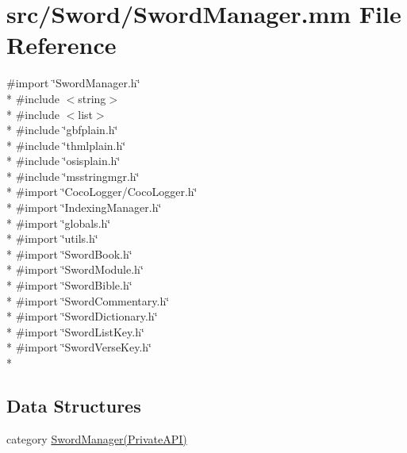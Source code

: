 \hypertarget{_sword_manager_8mm}{\section{src/\-Sword/\-Sword\-Manager.mm File Reference}
\label{_sword_manager_8mm}
}
{\ttfamily \#import \char`\"{}Sword\-Manager.\-h\char`\"{}}\\*
{\ttfamily \#include $<$string$>$}\\*
{\ttfamily \#include $<$list$>$}\\*
{\ttfamily \#include \char`\"{}gbfplain.\-h\char`\"{}}\\*
{\ttfamily \#include \char`\"{}thmlplain.\-h\char`\"{}}\\*
{\ttfamily \#include \char`\"{}osisplain.\-h\char`\"{}}\\*
{\ttfamily \#include \char`\"{}msstringmgr.\-h\char`\"{}}\\*
{\ttfamily \#import \char`\"{}Coco\-Logger/\-Coco\-Logger.\-h\char`\"{}}\\*
{\ttfamily \#import \char`\"{}Indexing\-Manager.\-h\char`\"{}}\\*
{\ttfamily \#import \char`\"{}globals.\-h\char`\"{}}\\*
{\ttfamily \#import \char`\"{}utils.\-h\char`\"{}}\\*
{\ttfamily \#import \char`\"{}Sword\-Book.\-h\char`\"{}}\\*
{\ttfamily \#import \char`\"{}Sword\-Module.\-h\char`\"{}}\\*
{\ttfamily \#import \char`\"{}Sword\-Bible.\-h\char`\"{}}\\*
{\ttfamily \#import \char`\"{}Sword\-Commentary.\-h\char`\"{}}\\*
{\ttfamily \#import \char`\"{}Sword\-Dictionary.\-h\char`\"{}}\\*
{\ttfamily \#import \char`\"{}Sword\-List\-Key.\-h\char`\"{}}\\*
{\ttfamily \#import \char`\"{}Sword\-Verse\-Key.\-h\char`\"{}}\\*
\subsection*{Data Structures}
\begin{DoxyCompactItemize}
\item 
category \hyperlink{category_sword_manager_07_private_a_p_i_08}{Sword\-Manager(\-Private\-A\-P\-I)}
\end{DoxyCompactItemize}
